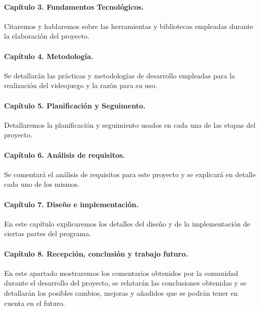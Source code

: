 \paragraph*{Capítulo 3. Fundamentos Tecnológicos.}
Citaremos y hablaremos sobre las herramientas y bibliotecas empleadas durante la elaboración del proyecto.

\paragraph*{Capítulo 4. Metodología.}
Se detallarán las prácticas y metodologías de desarrollo empleadas para la realización del videojuego y la razón para su uso.

\paragraph*{Capítulo 5. Planificación y Seguimento.}
Detallaremos la planificación y seguimiento usados en cada una de las etapas del proyecto. 

\paragraph*{Capítulo 6. Análisis de requisitos.}
Se comentará el análisis de requisitos para este proyecto y se explicará en detalle cada uno de los mismos.

\paragraph*{Capítulo 7. Diseño e implementación.}
En este capítulo explicaremos los detalles del diseño y de la implementación de ciertas partes del programa.

\paragraph*{Capítulo 8. Recepción, conclusión y trabajo futuro.}
En este apartado mostraremos los comentarios obtenidos por la comunidad durante el desarrollo del proyecto, se relatarán las conclusiones obtenidas y se detallarán los posibles cambios, mejoras y añadidos que se podrán tener en cuenta en el futuro.
